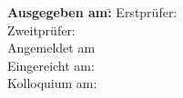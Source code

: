\vspace*{19cm}
\begin{tabbing}
    \textbf{Ausgegeben am:}\qquad \= \kill
    \textsf{Erstprüfer:} \> 	\textsf{\workReferent}\\[0.2cm]
    \textsf{Zweitprüfer:} \> \textsf{\workKorreferent}\\[0.2cm]
    \textsf{Angemeldet am} \> \textsf{\workAusgabe}\\[0.2cm]
    \textsf{Eingereicht am:} \> \textsf{\workAbgabe}\\[0.2cm]
\textsf{Kolloquium am:} \> \textsf{\workKolloqium}\\[0.2cm]
\end{tabbing}